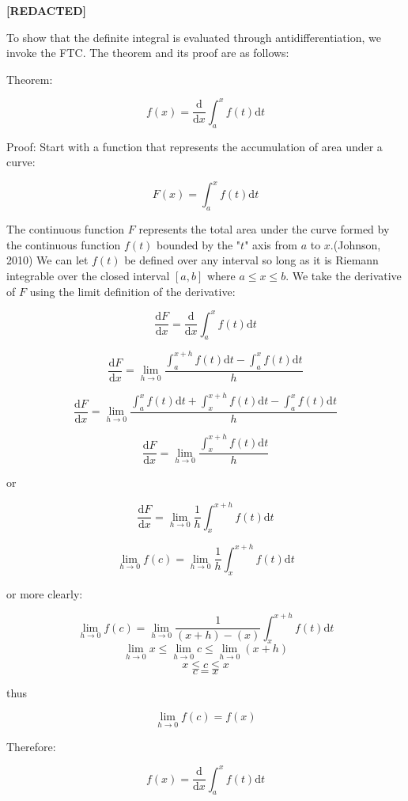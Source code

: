 \documentclass[11pt]{article}
\begin{document}
{\centering{}\Huge{}\textbf{[REDACTED]}\normalsize{}

}

To show that the definite integral is evaluated through antidifferentiation, we invoke the FTC. The theorem and its proof are as follows:

Theorem:

\Large{}$$f(x) = \frac{\mathrm{d}}{\mathrm{d}x}\int_{a}^{x}{f(t)\mathrm{d}t}$$\normalsize{}

Proof: Start with a function that represents the accumulation of area under a curve:

\Large{}$$F(x) = \int_{a}^{x}{f(t)\mathrm{d}t}$$\normalsize{}

The continuous function $F$ represents the total area under the curve formed by the continuous function $f(t)$ bounded by the "$t$" axis from $a$ to $x$.(Johnson, 2010) We can let $f(t)$ be defined over any interval so long as it is Riemann integrable over the closed interval $[a,b]$ where $a\leq{x}\leq{b}$. We take the derivative of $F$ using the limit definition of the derivative:\pagebreak

\Large{}$$\frac{\mathrm{d}F}{\mathrm{d}x} = \frac{\mathrm{d}}{\mathrm{d}x}\int_{a}^{x}{f(t)\mathrm{d}t}$$

$$\frac{\mathrm{d}F}{\mathrm{d}x} = \lim_{h\to{0}}{\frac{\int_{a}^{x+h}{f(t)\mathrm{d}t}-\int_{a}^{x}{f(t)\mathrm{d}t}}{h}}$$

$$\frac{\mathrm{d}F}{\mathrm{d}x} = \lim_{h\to{0}}{\frac{\int_{a}^{x}{f(t)\mathrm{d}t}+\int_{x}^{x+h}{f(t)\mathrm{d}t}-\int_{a}^{x}{f(t)\mathrm{d}t}}{h}}$$

\Large{}$$\frac{\mathrm{d}F}{\mathrm{d}x} = \lim_{h\to{0}}{\frac{\int_{x}^{x+h}{f(t)\mathrm{d}t}}{h}}$$
\begin{center}
or
\end{center}
$$\frac{\mathrm{d}F}{\mathrm{d}x} = \lim_{h\to{0}}{\frac{1}{h}\int_{x}^{x+h}{f(t)\mathrm{d}t}}$$\pagebreak

\Large{}$$\lim_{h\to{0}}f(c) = \lim_{h\to{0}}{\frac{1}{h}\int_{x}^{x+h}{f(t)\mathrm{d}t}}$$
\begin{center}
or more clearly:
\end{center}
$$\lim_{h\to{0}}f(c) = \lim_{h\to{0}}{\frac{1}{(x+h)-(x)}\int_{x}^{x+h}{f(t)\mathrm{d}t}}$$
$$\lim_{h\to 0} x\leq \lim_{h\to 0} c\leq \lim_{h\to 0} (x+h)$$
$$x\leq c\leq x$$
$$c = x$$
\begin{center}
thus
\end{center}
$$\lim_{h\to 0}f(c) = f(x)$$
\begin{center}
Therefore:
\end{center}
$$f(x) = \frac{\mathrm{d}}{\mathrm{d}x}\int_{a}^{x}{f(t)\mathrm{d}t}$$\normalsize{}
\end{document}
